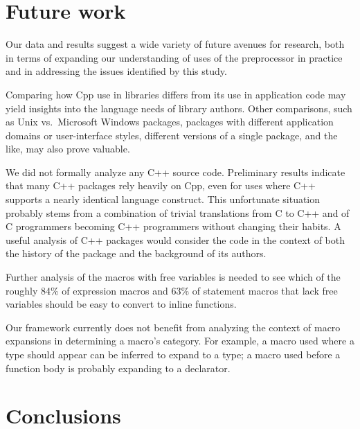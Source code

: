 \documentclass[10pt]{article}
\begin{document}
\section{Future work}
\label{sec:future-work}

 
Our data and results suggest a wide variety of future avenues for research,
both in terms of expanding our understanding of uses of the
preprocessor in practice and in addressing the issues identified by
this study.

Comparing how Cpp use in libraries differs from its use in application code
may yield insights into the language needs of library authors.  Other
comparisons, such as Unix vs.~Microsoft Windows packages, packages with
different application domains or user-interface styles, different versions
of a single package, and the like, may also prove valuable.

We did not formally analyze any C++ source code.  Preliminary results
indicate that many C++ packages rely heavily on Cpp, even for uses where C++ supports
a nearly identical language construct.  This unfortunate situation probably
stems from a combination of trivial translations from C to C++ and of C
programmers becoming C++ programmers without changing their habits.  A
useful analysis of C++ packages would consider the code in the context of
both the history of the package and the background of its authors.


Further analysis of the macros with free variables is needed to see which
of the roughly 84\% of expression macros and 63\% of statement macros that
lack free variables should be easy to convert to inline functions.

Our framework currently does not benefit from analyzing the context of
macro expansions in determining a macro's category.  For example, a
macro used where a type should appear can be inferred to expand to a
type; a macro used before a function body is probably expanding to a
declarator.



\section{Conclusions}
\label{sec:conclusion}
\end{document}
